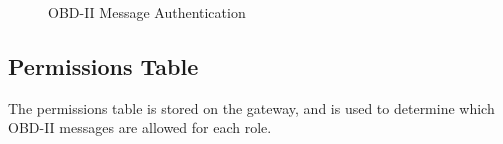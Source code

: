\documentclass[master=cws,masteroption=vs,english]{kulemt}
\begin{document}
\begin{figure}[h]
	\centering
	\caption{OBD-II Message Authentication}
	\label{fig:message_authentication}
\end{figure}

\subsection{Permissions Table} 
\label{sec:permissions_table}
The permissions table is stored on the gateway, and is used to determine which OBD-II messages are allowed for each role.

\backmatter



\end{document}
